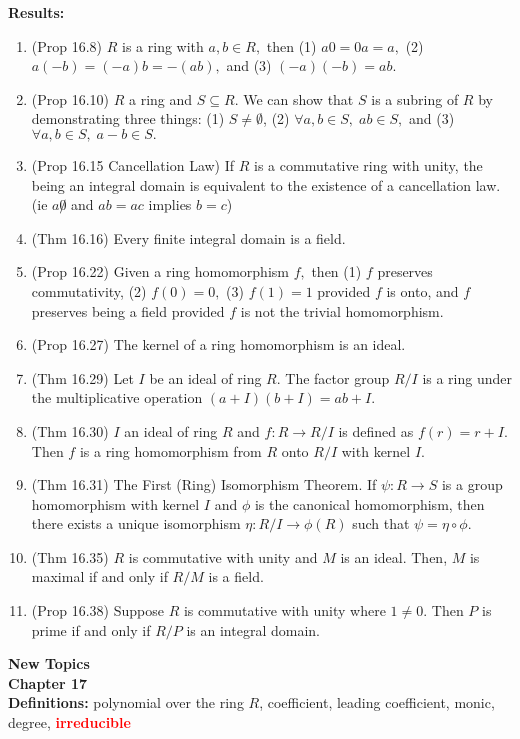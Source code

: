 \documentclass[12pt]{article}
\newcommand{\bfr}[1]{\textbf{\textcolor{red}{#1}}}
\begin{document}
\noindent \textbf{Results:} \\
\begin{enumerate}
	\item (Prop 16.8) $R$ is a ring with $a,b \in R,$ then (1) $a0=0a=a,$ (2) $a(-b)=(-a)b=-(ab),$ and (3) $(-a)(-b)=ab.$
	\item (Prop 16.10) $R$ a ring and $S \subseteq R$. We can show that $S$ is a subring of $R$ by demonstrating three things: (1) $S \not = \emptyset$, (2) $\forall a,b \in S, \; ab \in S,$ and (3)  $\forall a,b \in S, \; a-b \in S.$
	\item  (Prop 16.15 Cancellation Law) If $R$ is a commutative ring with unity, the being an integral domain is equivalent to the existence of a cancellation law. (ie $a \not 0$ and $ab=ac$ implies $b=c$)
	\item (Thm 16.16) Every finite integral domain is a field.
	\item (Prop 16.22) Given a ring  homomorphism $f,$ then (1) $f$ preserves commutativity, (2) $f(0)=0,$ (3) $f(1)=1$ provided $f$ is onto, and $f$ preserves being a field provided $f$ is not the trivial homomorphism.
	\item (Prop 16.27) The kernel of a ring homomorphism is an ideal.
	\item (Thm 16.29) Let $I$ be an ideal of ring $R.$ The factor group $R/I$ is a ring under the multiplicative operation $(a+I)(b+I)=ab+I.$
	\item (Thm 16.30) $I$ an ideal of ring $R$ and $f: R \to R/I$ is defined as $f(r)=r+I.$ Then $f$ is a ring homomorphism from $R$ onto $R/I$ with kernel $I.$
	\item (Thm 16.31) The First (Ring) Isomorphism Theorem. If $\psi: R \to S$ is a group homomorphism with kernel $I$ and $\phi$ is the canonical homomorphism, then there exists a unique isomorphism $\eta: R/I \to \phi(R)$ such that $\psi=\eta \circ \phi.$
	\item (Thm 16.35) $R$ is commutative with unity and $M$ is an ideal. Then, $M$ is maximal if and only if $R/M$ is a field.
	\item (Prop 16.38) Suppose $R$ is commutative with unity where $1 \not = 0.$ Then $P$ is prime if and only if $R/P$ is an integral domain.
\end{enumerate}

\textbf{New Topics}\\
\noindent \textbf{Chapter 17}\\

\noindent \textbf{Definitions:} polynomial over the ring $R$, coefficient, leading coefficient, monic, degree, \bfr{irreducible}\\
\end{document}
